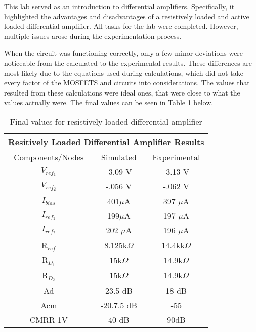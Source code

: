 

This lab served as an introduction to differential amplifiers. Specifically, it highlighted the advantages and disadvantages of a resistively loaded and active loaded differential amplifier. All tasks for the lab were completed. However, multiple issues arose during the experimentation process. 

When the circuit was functioning correctly, only a few minor deviations were noticeable from the calculated to the experimental results. These differences are most likely due to the equations used during calculations, which did not take every factor of the MOSFETS and circuits into considerations. The values that resulted from these calculations were ideal ones, that were close to what the values actually were. The final values can be seen in Table \ref{tab:FinalRes} below. 

\begin{table}[H]
\centering
\caption{Final values for resistively loaded differential amplifier}
\label{tab:FinalRes}
\begin{tabular}{|c|c|c|}
\hline
\multicolumn{3}{|c|}{Resitively Loaded Differential Amplifier Results} \\ \hline
Components/Nodes          & Simulated          & Experimental          \\ \hline
$V_{ref_1}$               & -3.09 V                   & -3.13 V                      \\ \hline
$V_{ref_2}$               & -.056 V                   & -.062 V                      \\ \hline
$I_{bias}$                & 401$\mu$A                   & 397 $\mu$A                      \\ \hline
$I_{ref_1}$               & 199$\mu$A                   & 197 $\mu$A                      \\ \hline
$I_{ref_2}$               & 202 $\mu$A                    &  196 $\mu$A                     \\ \hline
R$_{ref}$                 & 8.125k$\Omega$               & 14.4kk$\Omega$                     \\ \hline
R$_{D_1}$                 & 15k$\Omega$                   & 14.9k$\Omega$                      \\ \hline
R$_{D_2}$                 & 15k$\Omega$                   & 14.9k$\Omega$                      \\ \hline
Ad                       & 23.5 dB             & 18 dB \\ \hline
Acm                      & -20.7.5 dB            & -55 \\ \hline
CMRR 1V                    & 40 dB               & 90dB \\ \hline
\end{tabular}
\end{table}

